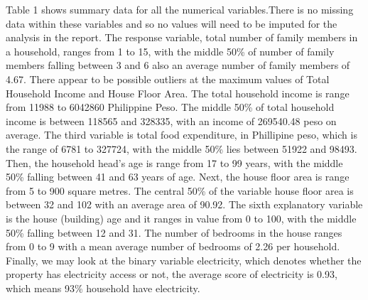 \documentclass[
]{article}
\begin{document}
Table 1 shows summary data for all the numerical variables.There is no
missing data within these variables and so no values will need to be
imputed for the analysis in the report. The response variable, total
number of family members in a household, ranges from 1 to 15, with the
middle 50\% of number of family members falling between 3 and 6 also an
average number of family members of 4.67. There appear to be possible
outliers at the maximum values of Total Household Income and House Floor
Area. The total household income is range from 11988 to 6042860
Philippine Peso. The middle 50\% of total household income is between
118565 and 328335, with an income of 269540.48 peso on average. The
third variable is total food expenditure, in Phillipine peso, which is
the range of 6781 to 327724, with the middle 50\% lies between 51922 and
98493. Then, the household head's age is range from 17 to 99 years, with
the middle 50\% falling between 41 and 63 years of age. Next, the house
floor area is range from 5 to 900 square metres. The central 50\% of the
variable house floor area is between 32 and 102 with an average area of
90.92. The sixth explanatory variable is the house (building) age and it
ranges in value from 0 to 100, with the middle 50\% falling between 12
and 31. The number of bedrooms in the house ranges from 0 to 9 with a
mean average number of bedrooms of 2.26 per household. Finally, we may
look at the binary variable electricity, which denotes whether the
property has electricity access or not, the average score of electricity
is 0.93, which means 93\% household have electricity.

\begin{table}

\caption{\label{tab:numerical summaries}Summary statistics of numerical variables}
\centering
{}
\end{table}
\end{document}
